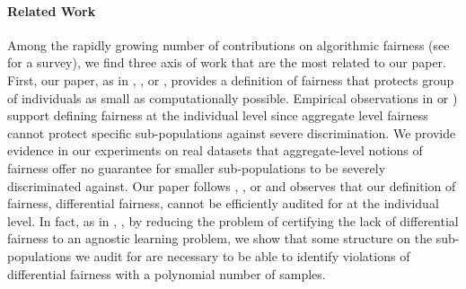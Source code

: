 \documentclass{article}
\begin{document}
 \paragraph{Related Work}
 Among the rapidly growing number of contributions on algorithmic fairness (see  \cite{chouldechova2018frontiers} for a survey), we find three axis of work that are the most related to our paper. First, our paper, as in  \cite{hebert2017calibration}, \cite{kim2018fairness}, or \cite{kearns2017preventing}, provides a definition of fairness that protects group of individuals as small as computationally possible. Empirical observations in \cite{kearns2017preventing} or \cite{dwork2012fairness}) support defining fairness at the individual level since aggregate level fairness cannot protect specific sub-populations against severe discrimination. We provide evidence in our experiments on real datasets that aggregate-level notions of fairness offer no guarantee for smaller sub-populations to be severely discriminated against.  Our paper follows  \cite{hebert2017calibration}, \cite{kim2018fairness}, or \cite{kearns2017preventing} and observes that our definition of fairness, differential fairness, cannot be efficiently audited for at the individual level. In fact, as in \cite{hebert2017calibration}, \cite{kim2018fairness}, by reducing the problem of certifying the lack of differential fairness to an agnostic learning problem, we show that some structure on the sub-populations we audit for are necessary to be able to identify violations of differential fairness with a polynomial number of samples. 
 
\end{document}
